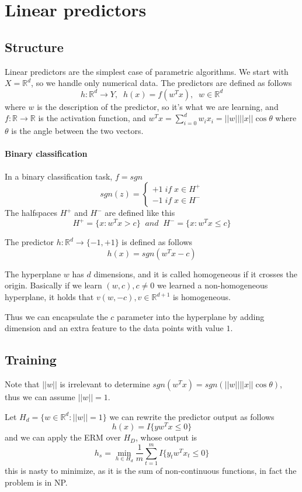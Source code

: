 \section{Linear predictors}

\subsection{Structure}
Linear predictors are the simplest case of 
parametric algorithms.
We start with $X = \mathbb{R}^d$, so we handle only numerical
data. The predictors are defined as follows 
$$h : \mathbb{R}^d \rightarrow Y, \;\; h(x) = f(w^Tx), \;\; w \in \mathbb{R}^d$$
where $w$ is the description of the predictor, so it's what we are 
learning, and $f : \mathbb{R} \rightarrow \mathbb{R}$ is the activation function, 
and $w^Tx = \sum_{i=0}^d w_ix_i = ||w||||x|| \cos \theta$ where $\theta$
is the angle between the two vectors.

\paragraph{Binary classification}
In a binary classification task, $f = \mathit{sgn}$ 
\[
    \mathit{sgn}(z) = \begin{cases}
        +1 \mathit{\;if\;} x \in H^+\\
        -1 \mathit{\;if\;} x \in H^-
    \end{cases}\]
The halfspaces $H^+$ and $H^-$ are defined like this
$$H^+ = \big\{ x : w^Tx > c\big\} \;\;\mathit{and}\;\; H^- = \big\{ x : w^Tx \leq c\big\}$$

The predictor $h : \mathbb{R}^d \rightarrow \{-1, +1\}$ is defined 
as follows
$$h(x) = \mathit{sgn}(w^Tx - c)$$

The hyperplane $w$ has $d$ dimensions, and it is called homogeneous
if it crosses the origin. Basically if we learn $(w, c), c\neq 0$ we learned 
a non-homogeneous hyperplane, it holds that $v(w, -c), v\in \mathbb{R}^{d+1}$ is homogeneous.

Thus we can encapsulate the $c$ parameter into the hyperplane by adding 
dimension and an extra feature to the data points with value $1$.

\subsection{Training}
Note that $||w||$ is irrelevant to determine $\mathit{sgn}(w^Tx)
= \mathit{sgn}(||w||||x||\cos \theta)$, thus we can assume $||w|| = 1$.

Let $H_d = \{ w \in \mathbb{R}^d : ||w|| = 1\}$ we can rewrite the predictor 
output as follows 
$$h(x) = I\{ yw^Tx \leq 0\}$$
and we can apply the ERM over $H_D$, whose output is 
$$h_s = \min_{h \in H_d} \frac{1}{m} \sum_{t=1}^m I\{ y_tw^Tx_t \leq 0\}$$
this is nasty to minimize, as it is the sum of non-continuous functions, 
in fact the problem is in NP.
